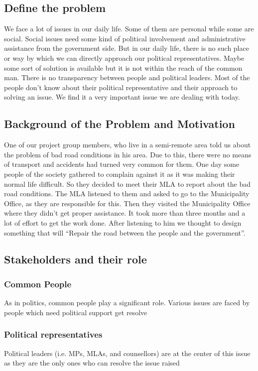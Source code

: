 \documentclass[acmtog]{acmart}
\begin{document}
\subsection{Define the problem}
We face a lot of issues in our daily life. Some of them are personal while some are social. Social issues need some kind of political involvement and administrative assistance from the government side. But in our daily life, there is no such place or way by which we can directly approach our political representatives. Maybe some sort of solution is available but it is not within the reach of the common man. There is no transparency between people and political leaders. Most of the people don’t know about their political representative and their approach to solving an issue. We find it a very important issue we are dealing with today.

\subsection{Background of the Problem and Motivation}
One of our project group members, who live in a semi-remote area told us about the problem of bad road conditions in his area. Due to this, there were no means of transport and accidents had turned very common for them. One day some people of the society gathered to complain against it as it was making their normal life difficult. So they decided to meet their MLA to report about the bad road conditions. The MLA listened to them and asked to go to the Municipality Office, as they are responsible for this. Then they visited the Municipality Office where they didn’t get proper assistance. It took more than three months and a lot of effort to get the work done. After listening to him we thought to design something that will “Repair the road between the people and the government”.

\subsection{Stakeholders and their role}
\subsubsection{Common People}
As in politics, common people play a significant role. Various issues are faced by people which need political support get resolve
\subsubsection{Political representatives}
Political leaders (i.e. MPs, MLAs, and counsellors) are at the center of this issue as they are the only ones who can resolve the issue raised
\end{document}
